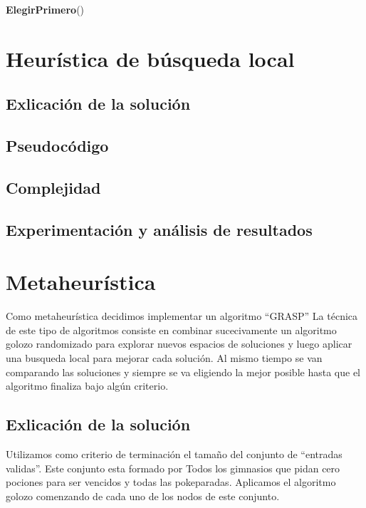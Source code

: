 \documentclass[spanish,12pt]{article}
\begin{document}
\begin{algorithm}[H]{\textbf{ElegirPrimero}()}


\section{Heurística de búsqueda local}

\subsection{Exlicación de la solución}

\subsection{Pseudocódigo}

\subsection{Complejidad}

\subsection{Experimentación y análisis de resultados}



\section{Metaheurística}

Como metaheurística decidimos implementar un algoritmo ``GRASP''
La técnica de este tipo de algoritmos consiste en combinar sucecivamente un algoritmo golozo randomizado para explorar nuevos espacios de soluciones y luego aplicar una busqueda local para mejorar cada solución. Al mismo tiempo se van comparando las soluciones y siempre se va eligiendo la mejor posible hasta que el algoritmo finaliza bajo algún criterio.

\subsection{Exlicación de la solución}

Utilizamos como criterio de terminación el tamaño del conjunto de ``entradas validas''. Este conjunto esta formado por Todos los gimnasios que pidan cero pociones para ser vencidos y todas las pokeparadas. Aplicamos el algoritmo golozo comenzando de cada uno de los nodos de este conjunto. 


\end{algorithm}
\end{document}

